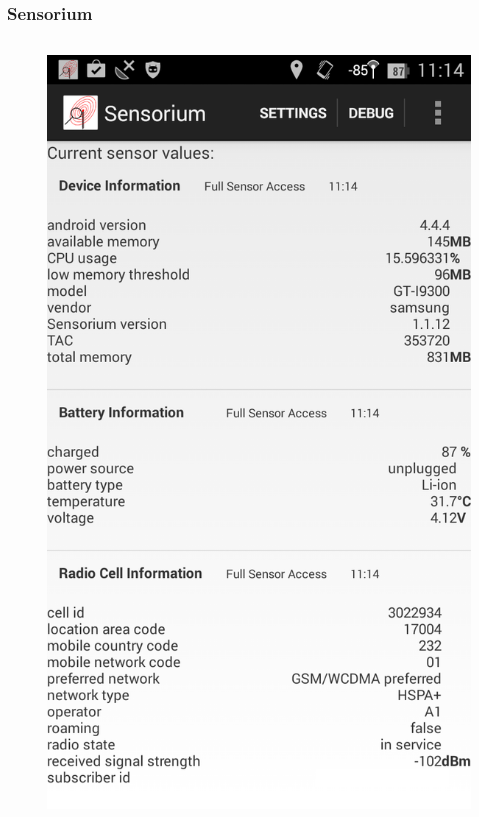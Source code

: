 \documentclass{beamer}
\begin{document}
\begin{frame}
	\frametitle{Sensorium}
	\begin{columns}
		\begin{figure}
			\includegraphics[width=0.6\columnwidth]{../../chapters/06-mobilestreamingmeasurements/images/sensorium.png}
		\end{figure}


\end{columns}
\end{frame}
\end{document}
